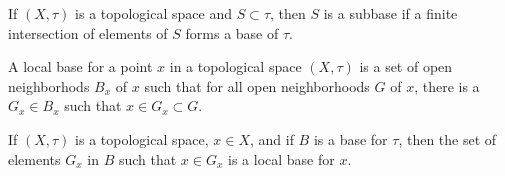     \begin{definition}
        If $(X,\tau)$ is a topological space
        and $S\subset\tau$, then $S$ is a subbase
        if a finite intersection of elements of $S$
        forms a base of $\tau$.
    \end{definition}
    \begin{definition}
        A local base for a point
        $x$ in a topological space $(X,\tau)$
        is a set of open neighborhods $B_{x}$ of
        $x$ such that for all open neighborhoods $G$
        of $x$, there is a $G_{x}\in{B_{x}}$ such that
        $x\in{G_{x}}\subset{G}$.
    \end{definition}
    \begin{theorem}
        If $(X,\tau)$ is a topological space, $x\in{X}$,
        and if $B$ is a base for $\tau$, then
        the set of elements $G_{x}$ in $B$ such that
        $x\in{G_{x}}$ is a local base for $x$.
    \end{theorem}
